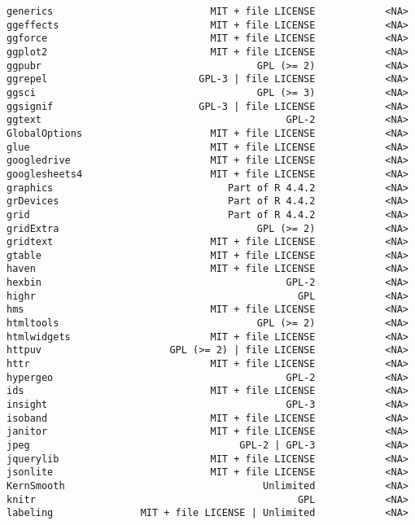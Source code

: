 \documentclass[
  letterpaper,
  DIV=11,
  numbers=noendperiod]{scrreprt}
\begin{document}
\begin{verbatim}
generics                           MIT + file LICENSE            <NA>
ggeffects                          MIT + file LICENSE            <NA>
ggforce                            MIT + file LICENSE            <NA>
ggplot2                            MIT + file LICENSE            <NA>
ggpubr                                     GPL (>= 2)            <NA>
ggrepel                          GPL-3 | file LICENSE            <NA>
ggsci                                      GPL (>= 3)            <NA>
ggsignif                         GPL-3 | file LICENSE            <NA>
ggtext                                          GPL-2            <NA>
GlobalOptions                      MIT + file LICENSE            <NA>
glue                               MIT + file LICENSE            <NA>
googledrive                        MIT + file LICENSE            <NA>
googlesheets4                      MIT + file LICENSE            <NA>
graphics                              Part of R 4.4.2            <NA>
grDevices                             Part of R 4.4.2            <NA>
grid                                  Part of R 4.4.2            <NA>
gridExtra                                  GPL (>= 2)            <NA>
gridtext                           MIT + file LICENSE            <NA>
gtable                             MIT + file LICENSE            <NA>
haven                              MIT + file LICENSE            <NA>
hexbin                                          GPL-2            <NA>
highr                                             GPL            <NA>
hms                                MIT + file LICENSE            <NA>
htmltools                                  GPL (>= 2)            <NA>
htmlwidgets                        MIT + file LICENSE            <NA>
httpuv                      GPL (>= 2) | file LICENSE            <NA>
httr                               MIT + file LICENSE            <NA>
hypergeo                                        GPL-2            <NA>
ids                                MIT + file LICENSE            <NA>
insight                                         GPL-3            <NA>
isoband                            MIT + file LICENSE            <NA>
janitor                            MIT + file LICENSE            <NA>
jpeg                                    GPL-2 | GPL-3            <NA>
jquerylib                          MIT + file LICENSE            <NA>
jsonlite                           MIT + file LICENSE            <NA>
KernSmooth                                  Unlimited            <NA>
knitr                                             GPL            <NA>
labeling               MIT + file LICENSE | Unlimited            <NA>

\end{verbatim}
\end{document}
